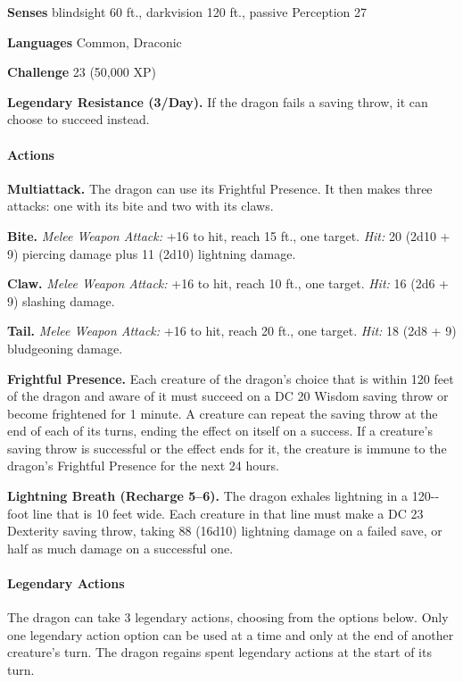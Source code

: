 \documentclass[
]{article}
\begin{document}
\textbf{Senses} blindsight 60 ft., darkvision 120 ft., passive
Perception 27

\textbf{Languages} Common, Draconic

\textbf{Challenge} 23 (50,000 XP)

\textbf{Legendary Resistance (3/Day).} If the dragon fails a saving
throw, it can choose to succeed instead.

\hypertarget{actions-27}{%
\paragraph{Actions}\label{actions-27}}

\textbf{Multiattack.} The dragon can use its Frightful Presence. It then
makes three attacks: one with its bite and two with its claws.

\textbf{Bite.} \emph{Melee Weapon Attack:} +16 to hit, reach 15 ft., one
target. \emph{Hit:} 20 (2d10 + 9) piercing damage plus 11 (2d10)
lightning damage.

\textbf{Claw.} \emph{Melee Weapon Attack:} +16 to hit, reach 10 ft., one
target. \emph{Hit:} 16 (2d6 + 9) slashing damage.

\textbf{Tail.} \emph{Melee Weapon Attack:} +16 to hit, reach 20 ft., one
target. \emph{Hit:} 18 (2d8 + 9) bludgeoning damage.

\textbf{Frightful Presence.} Each creature of the dragon's choice that
is within 120 feet of the dragon and aware of it must succeed on a DC 20
Wisdom saving throw or become frightened for 1 minute. A creature can
repeat the saving throw at the end of each of its turns, ending the
effect on itself on a success. If a creature's saving throw is
successful or the effect ends for it, the creature is immune to the
dragon's Frightful Presence for the next 24 hours.

\textbf{Lightning Breath (Recharge 5--6).} The dragon exhales lightning
in a 120-­‐foot line that is 10 feet wide. Each creature in that line
must make a DC 23 Dexterity saving throw, taking 88 (16d10) lightning
damage on a failed save, or half as much damage on a successful one.

\hypertarget{legendary-actions-2}{%
\paragraph{Legendary Actions}\label{legendary-actions-2}}

The dragon can take 3 legendary actions, choosing from the options
below. Only one legendary action option can be used at a time and only
at the end of another creature's turn. The dragon regains spent
legendary actions at the start of its turn.
\end{document}
